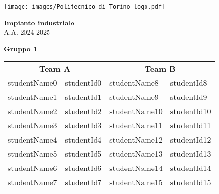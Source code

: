 \documentclass[11pt]{article}
\begin{document}
\thispagestyle{empty}

\begin{flushright}
    \texttt{[image: images/Politecnico di Torino logo.pdf]}
\end{flushright}

\vspace*{7cm}

\begin{flushleft}
    {\Huge\bfseries Impianto industriale} \\
    \vspace{1em}
    {\large A.A. 2024-2025} \\
    \vspace{4em}

    {\Large\bfseries Gruppo 1} \\
    \vspace{1em}
    \begin{tabular}{ll|ll}
        \multicolumn{2}{c|}{\textbf{Team A}} & \multicolumn{2}{c}{\textbf{Team B}} \\
        \large {{studentName0}} & \large {{studentId0}} & \large {{studentName8}} & \large {{studentId8}} \\
        \large {{studentName1}} & \large {{studentId1}} & \large {{studentName9}} & \large {{studentId9}} \\
        \large {{studentName2}} & \large {{studentId2}} & \large {{studentName10}} & \large {{studentId10}} \\
        \large {{studentName3}} & \large {{studentId3}} & \large {{studentName11}} & \large {{studentId11}} \\
        \large {{studentName4}} & \large {{studentId4}} & \large {{studentName12}} & \large {{studentId12}} \\
        \large {{studentName5}} & \large {{studentId5}} & \large {{studentName13}} & \large {{studentId13}} \\
        \large {{studentName6}} & \large {{studentId6}} & \large {{studentName14}} & \large {{studentId14}} \\
        \large {{studentName7}} & \large {{studentId7}} & \large {{studentName15}} & \large {{studentId15}} \\
    \end{tabular}

\end{flushleft}

\vfill

\newpage
\thispagestyle{empty}
\tableofcontents
\end{document}

